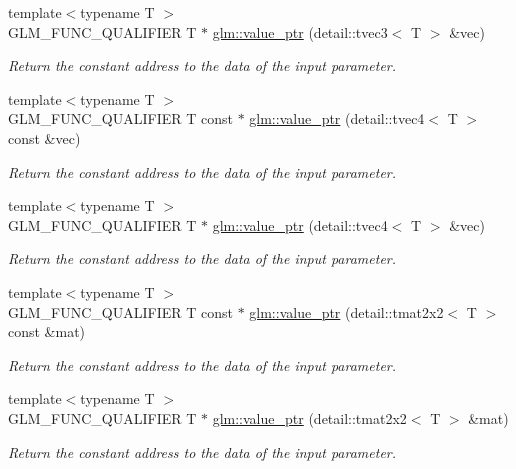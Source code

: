 \begin{DoxyCompactItemize}
{\footnotesize template$<$typename T $>$ }\\G\-L\-M\-\_\-\-F\-U\-N\-C\-\_\-\-Q\-U\-A\-L\-I\-F\-I\-E\-R T $\ast$ \hyperlink{group__gtc__type__ptr_ga3dfe9e6a5ebc3beeaa3a8b35cf2ffe1d}{glm\-::value\-\_\-ptr} (detail\-::tvec3$<$ T $>$ \&vec)
\begin{DoxyCompactList}\small\item\em Return the constant address to the data of the input parameter. \end{DoxyCompactList}\item 
{\footnotesize template$<$typename T $>$ }\\G\-L\-M\-\_\-\-F\-U\-N\-C\-\_\-\-Q\-U\-A\-L\-I\-F\-I\-E\-R T const $\ast$ \hyperlink{group__gtc__type__ptr_ga75dd1f5ad6d007990c1f2cf55fe63789}{glm\-::value\-\_\-ptr} (detail\-::tvec4$<$ T $>$ const \&vec)
\begin{DoxyCompactList}\small\item\em Return the constant address to the data of the input parameter. \end{DoxyCompactList}\item 
{\footnotesize template$<$typename T $>$ }\\G\-L\-M\-\_\-\-F\-U\-N\-C\-\_\-\-Q\-U\-A\-L\-I\-F\-I\-E\-R T $\ast$ \hyperlink{group__gtc__type__ptr_ga63ee2093cab935f4471fdc55484aeb63}{glm\-::value\-\_\-ptr} (detail\-::tvec4$<$ T $>$ \&vec)
\begin{DoxyCompactList}\small\item\em Return the constant address to the data of the input parameter. \end{DoxyCompactList}\item 
{\footnotesize template$<$typename T $>$ }\\G\-L\-M\-\_\-\-F\-U\-N\-C\-\_\-\-Q\-U\-A\-L\-I\-F\-I\-E\-R T const $\ast$ \hyperlink{group__gtc__type__ptr_gabc0ecc372916bebbd130341cb0799376}{glm\-::value\-\_\-ptr} (detail\-::tmat2x2$<$ T $>$ const \&mat)
\begin{DoxyCompactList}\small\item\em Return the constant address to the data of the input parameter. \end{DoxyCompactList}\item 
{\footnotesize template$<$typename T $>$ }\\G\-L\-M\-\_\-\-F\-U\-N\-C\-\_\-\-Q\-U\-A\-L\-I\-F\-I\-E\-R T $\ast$ \hyperlink{group__gtc__type__ptr_ga09141ef8c41ab15f7989b620e748ae3c}{glm\-::value\-\_\-ptr} (detail\-::tmat2x2$<$ T $>$ \&mat)
\begin{DoxyCompactList}\small\item\em Return the constant address to the data of the input parameter. \end{DoxyCompactList}\item 

\end{DoxyCompactItemize}
